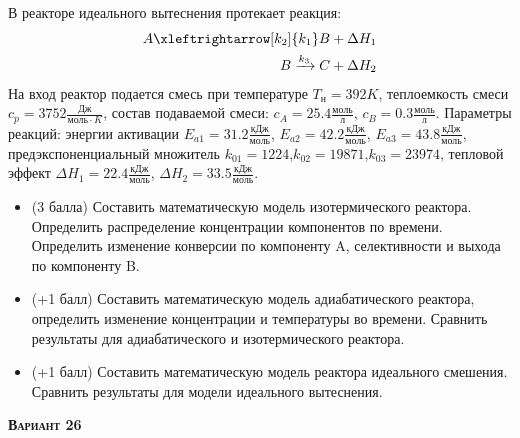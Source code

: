  В реакторе идеального вытеснения протекает реакция: \begin{equation*} \begin{aligned} A \xleftrightarrow[k_2]{k_1} B + \Delta H_1 \\ B \xrightarrow{k_3} C + \Delta H_2 \end{aligned} \end{equation*}                                      На вход  реактор подается смесь при температуре $ T_н =  392 K$, теплоемкость смеси $c_p= 3752 \frac{Дж}{моль \cdot K}$, состав подаваемой смеси: $c_A=25.4 \frac{моль}{л}$, $c_B=0.3 \frac{моль}{л}$. Параметры реакций: энергии активации $E_{a1}=31.2 \frac{кДж}{моль}$, $E_{a2}=42.2  \frac{кДж}{моль}$, $E_{a3}=43.8  \frac{кДж}{моль}$, предэкспоненциальный множитель $k_{01}=      1224$,$k_{02}=     19871$,$k_{03}=     23974$, тепловой эффект $\Delta H_1= 22.4  \frac{кДж}{моль}$, $\Delta H_2=33.5 \frac{кДж}{моль}$.\begin{itemize} \item (3 балла) Составить математическую модель изотермического реактора. Определить распределение концентрации компонентов по времени. Определить изменение конверсии по компоненту A, селективности и выхода по компоненту B. \item (+1 балл) Составить математическую модель адиабатического реактора, определить изменение концентрации и температуры во времени. Сравнить результаты для адиабатического и изотермического реактора. \item (+1 балл) Составить математическую модель реактора идеального смешения. Сравнить результаты для модели идеального вытеснения. \end{itemize}

\textsc{\textbf{Вариант 26}}

